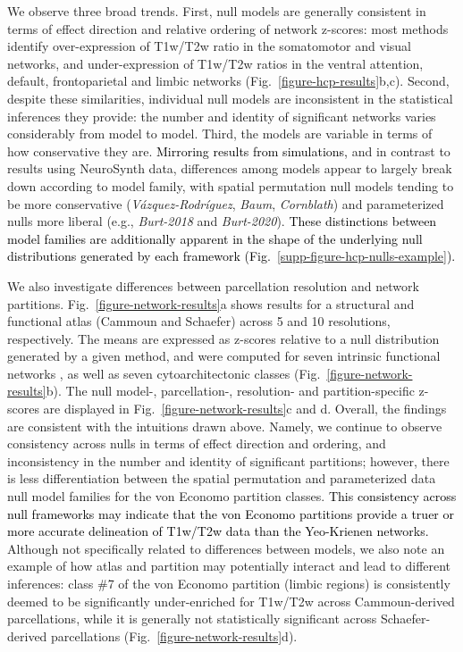 \documentclass[12pt,aps,pra,reprint,showkeys]{revtex4-1}
\newcommand{\nimg}[1]{\textcolor{black}{{#1}}}
\begin{document}
We observe three broad trends.
First, null models are generally consistent in terms of effect direction and relative ordering of network z-scores: most methods identify over-expression of T1w/T2w ratio in the somatomotor and visual networks, and under-expression of T1w/T2w ratios in the ventral attention, default, frontoparietal and limbic networks (Fig.~\ref{figure-hcp-results}b,c).
Second, despite these similarities, individual null models are inconsistent in the statistical inferences they provide: the number and identity of significant networks varies considerably from model to model.
Third, the models are variable in terms of how conservative they are.
\nimg{Mirroring results from simulations,} and in contrast to results using NeuroSynth data, differences among models appear to largely break down according to model family, with spatial permutation null models tending to be more conservative (\textit{V\'azquez-Rodr\'iguez}, \textit{Baum}, \textit{Cornblath}) and parameterized nulls more liberal (e.g., \textit{Burt-2018} and \textit{Burt-2020}).
\nimg{These distinctions between model families are additionally apparent in the shape of the underlying null distributions generated by each framework (Fig.~\ref{supp-figure-hcp-nulls-example}).}

We also investigate differences between parcellation resolution and network partitions.
Fig.~\ref{figure-network-results}a shows results for a structural and functional atlas (Cammoun and Schaefer) across 5 and 10 resolutions, respectively.
The means are expressed as z-scores relative to a null distribution generated by a given method, and were computed for seven intrinsic functional networks \citep{yeo2011organization}, as well as seven cytoarchitectonic classes \citep{voneconomo1925cytoarchitecture, scholtens2018neuroimage} (Fig.~\ref{figure-network-results}b).
The null model-, parcellation-, resolution- and partition-specific z-scores are displayed in Fig.~\ref{figure-network-results}c and d.
Overall, the findings are consistent with the intuitions drawn above.
Namely, we continue to observe consistency across nulls in terms of effect direction and ordering, and inconsistency in the number and identity of significant partitions; however, there is less differentiation between the spatial permutation and parameterized data null model families for the von Economo partition classes.
\nimg{This consistency across null frameworks may indicate that the von Economo partitions provide a truer or more accurate delineation of T1w/T2w data than the Yeo-Krienen networks.}
Although not specifically related to differences between models, we also note an example of how atlas and partition may potentially interact and lead to different inferences: class \#7 of the von Economo partition (limbic regions) is consistently deemed to be significantly under-enriched for T1w/T2w across Cammoun-derived parcellations, while it is generally not statistically significant across Schaefer-derived parcellations (Fig.~\ref{figure-network-results}d).
\end{document}
